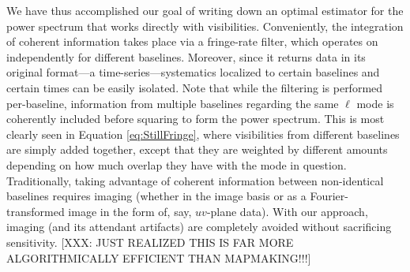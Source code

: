 \documentclass[twocolumn,apj,numberedappendix]{emulateapj}
\begin{document}
We have thus accomplished our goal of writing down an optimal estimator for the power spectrum that works directly with visibilities.  Conveniently, the integration of coherent information takes place via a fringe-rate filter, which operates on independently for different baselines.  Moreover, since it returns data in its original format---a time-series---systematics localized to certain baselines and certain times can be easily isolated.  Note that while the filtering is performed per-baseline, information from multiple baselines regarding the same $\ell$ mode is coherently included before squaring to form the power spectrum.  This is most clearly seen in Equation \eqref{eq:StillFringe}, where visibilities from different baselines are simply added together, except that they are weighted by different amounts depending on how much overlap they have with the mode in question.  Traditionally, taking advantage of coherent information between non-identical baselines requires imaging (whether in the image basis or as a Fourier-transformed image in the form of, say, $uv$-plane data).  With our approach, imaging (and its attendant artifacts) are completely avoided without sacrificing sensitivity.
[XXX: JUST REALIZED THIS IS FAR MORE ALGORITHMICALLY EFFICIENT THAN MAPMAKING!!!]
\end{document}
